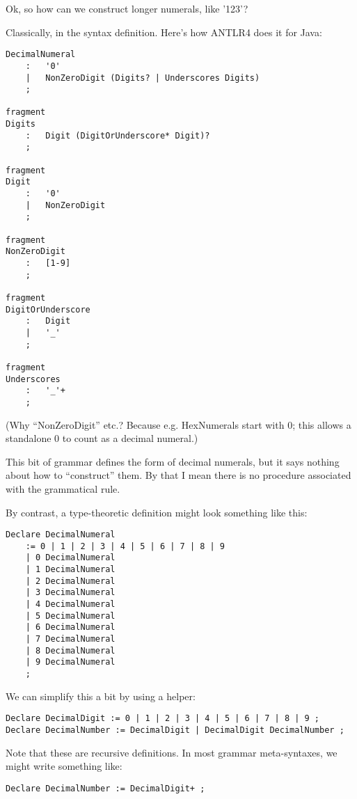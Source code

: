 Ok, so how can we construct longer numerals, like '123'?

Classically, in the syntax definition.  Here's how ANTLR4 does it for Java:

\begin{verbatim}
DecimalNumeral
    :   '0'
    |   NonZeroDigit (Digits? | Underscores Digits)
    ;

fragment
Digits
    :   Digit (DigitOrUnderscore* Digit)?
    ;

fragment
Digit
    :   '0'
    |   NonZeroDigit
    ;

fragment
NonZeroDigit
    :   [1-9]
    ;

fragment
DigitOrUnderscore
    :   Digit
    |   '_'
    ;

fragment
Underscores
    :   '_'+
    ;

\end{verbatim}

(Why ``NonZeroDigit'' etc.?  Because e.g. HexNumerals start with 0;
this allows a standalone 0 to count as a decimal numeral.)

This bit of grammar defines the form of decimal numerals, but it says
nothing about how to ``construct'' them.  By that I mean there is no
procedure associated with the grammatical rule.

By contrast, a type-theoretic definition might look something like this:

\begin{verbatim}
Declare DecimalNumeral
    := 0 | 1 | 2 | 3 | 4 | 5 | 6 | 7 | 8 | 9
    | 0 DecimalNumeral
    | 1 DecimalNumeral
    | 2 DecimalNumeral
    | 3 DecimalNumeral
    | 4 DecimalNumeral
    | 5 DecimalNumeral
    | 6 DecimalNumeral
    | 7 DecimalNumeral
    | 8 DecimalNumeral
    | 9 DecimalNumeral
    ;
\end{verbatim}

We can simplify this a bit by using a helper:

\begin{verbatim}
Declare DecimalDigit := 0 | 1 | 2 | 3 | 4 | 5 | 6 | 7 | 8 | 9 ;
Declare DecimalNumber := DecimalDigit | DecimalDigit DecimalNumber ;
\end{verbatim}

Note that these are recursive definitions.  In most grammar
meta-syntaxes, we might write something like:

\begin{verbatim}
Declare DecimalNumber := DecimalDigit+ ;
\end{verbatim}


